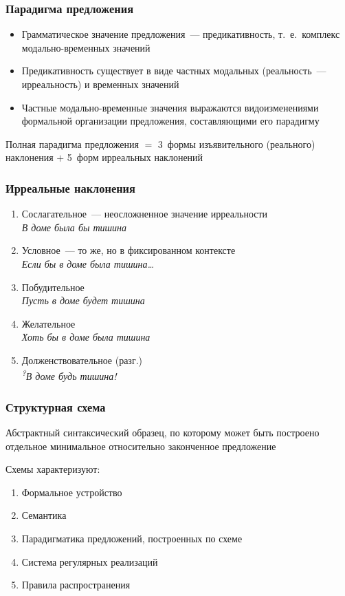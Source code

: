 \begin{frame}
  \frametitle{Парадигма предложения}

  \begin{itemize}
    \item Грамматическое значение предложения~--- предикативность, т.~е.\ комплекс модально-временных значений
    \item Предикативность существует в виде частных модальных (реальность~--- ирреальность) и временных значений
    \item Частные модально-временные значения выражаются видоизменениями формальной организации предложения, составляющими его парадигму
  \end{itemize}

  \vfill

  Полная парадигма предложения
  $=$ 3~формы изъявительного (реального) наклонения
  $+$ 5~форм ирреальных наклонений
\end{frame}

\begin{frame}
  \frametitle{Ирреальные наклонения}

  \begin{enumerate}
    \item Сослагательное~--- неосложненное значение ирреальности \\
      \textit{В доме была бы тишина}
    \item Условное~--- то же, но в фиксированном контексте \\
      \textit{Если бы в доме была тишина\ldots}
    \item Побудительное \\
      \textit{Пусть в доме будет тишина}
    \item Желательное \\
      \textit{Хоть бы в доме была тишина}
    \item Долженствовательное (разг.) \\
      \textit{\textsuperscript{?}В доме будь тишина!}
  \end{enumerate}
\end{frame}

\begin{frame}
  \frametitle{Структурная схема}

  Абстрактный синтаксический образец,
  по которому может быть построено отдельное минимальное относительно законченное предложение

  \vfill

  Схемы характеризуют:
  \begin{enumerate}
    \item Формальное устройство
    \item Семантика
    \item Парадигматика предложений, построенных по схеме
    \item Система регулярных реализаций
    \item Правила распространения
  \end{enumerate}
\end{frame}

